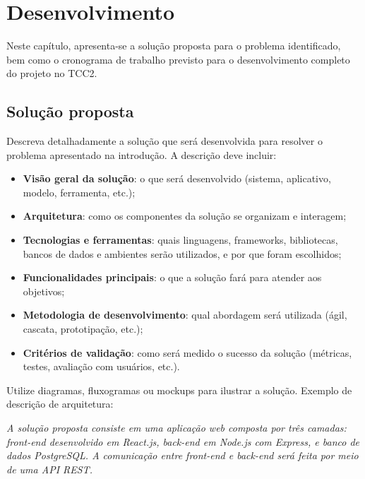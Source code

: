 \documentclass[
    12pt,                %
    openright,           %
    oneside,             %
    a4paper,             %
    english,             %
    brazil               %
]{abntex2}
\begin{document}
\chapter{Desenvolvimento}
\label{cap:desenvolvimento}

Neste capítulo, apresenta-se a solução proposta para o problema identificado, bem como o cronograma de trabalho previsto para o desenvolvimento completo do projeto no TCC2.

\section{Solução proposta}
\label{sec:solucao}

Descreva detalhadamente a solução que será desenvolvida para resolver o problema apresentado na introdução. A descrição deve incluir:

\begin{itemize}
    \item \textbf{Visão geral da solução}: o que será desenvolvido (sistema, aplicativo, modelo, ferramenta, etc.);
    \item \textbf{Arquitetura}: como os componentes da solução se organizam e interagem;
    \item \textbf{Tecnologias e ferramentas}: quais linguagens, frameworks, bibliotecas, bancos de dados e ambientes serão utilizados, e por que foram escolhidos;
    \item \textbf{Funcionalidades principais}: o que a solução fará para atender aos objetivos;
    \item \textbf{Metodologia de desenvolvimento}: qual abordagem será utilizada (ágil, cascata, prototipação, etc.);
    \item \textbf{Critérios de validação}: como será medido o sucesso da solução (métricas, testes, avaliação com usuários, etc.).
\end{itemize}

Utilize diagramas, fluxogramas ou mockups para ilustrar a solução. Exemplo de descrição de arquitetura:

\textit{A solução proposta consiste em uma aplicação web composta por três camadas: front-end desenvolvido em React.js, back-end em Node.js com Express, e banco de dados PostgreSQL. A comunicação entre front-end e back-end será feita por meio de uma API REST.}
\end{document}
